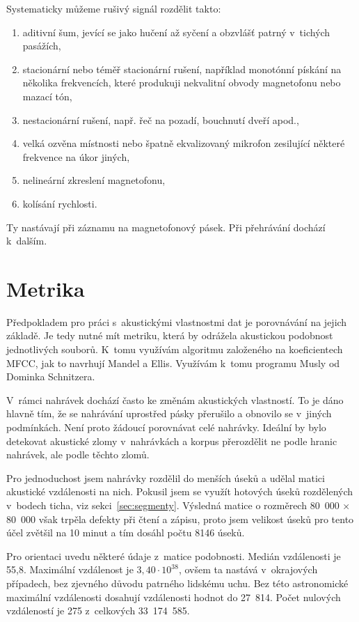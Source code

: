 Systematicky můžeme rušivý signál rozdělit takto:
\begin{enumerate}
\item{
    aditivní šum, jevící se jako hučení až syčení a obzvlášť patrný v~tichých
    pasážích,
}
\item{
    stacionární nebo téměř stacionární rušení, například monotónní pískání na
    několika frekvencích, které produkuji nekvalitní obvody magnetofonu
    nebo mazací tón,
}
\item{
    nestacionární rušení, např. řeč na pozadí, bouchnutí dveří apod.,
}
\item{
    velká ozvěna místnosti nebo špatně ekvalizovaný mikrofon zesilující
    některé frekvence na úkor jiných,
}
\item{
    nelineární zkreslení magnetofonu,
}
\item{
    kolísání rychlosti.
}
\end{enumerate}
Ty nastávají při záznamu na magnetofonový pásek. Při přehrávání dochází
k~dalším.

\section{Metrika}
\label{sec:akustika:metrika}

Předpokladem pro práci s~akustickými vlastnostmi dat je porovnávání na jejich
základě. Je tedy nutné mít metriku, která by odrážela akustickou podobnost
jednotlivých souborů. K~tomu využívám algoritmu založeného na koeficientech
MFCC, jak to navrhují Mandel a Ellis\cite{mandel2005song}. Využívám
k~tomu programu Musly od Dominka Schnitzera\cite{schnitzer2011using}.

V~rámci nahrávek dochází často ke změnám akustických vlastností. To je dáno
hlavně tím, že se nahrávání uprostřed pásky přerušilo a obnovilo se v~jiných
podmínkách. Není proto žádoucí porovnávat celé nahrávky. Ideální by bylo
detekovat akustické zlomy v~nahrávkách a korpus přerozdělit ne podle hranic
nahrávek, ale podle těchto zlomů.

Pro jednoduchost jsem nahrávky rozdělil do menších úseků a udělal matici
akustické vzdálenosti na nich. Pokusil jsem se využít hotových úseků rozdělených
v~bodech ticha, viz sekci~\ref{sec:segmenty}. Výsledná matice o rozměrech
80~000 × 80~000 však trpěla defekty při čtení a zápisu, proto jsem velikost
úseků pro tento účel zvětšil na 10 minut a tím dosáhl počtu 8146 úseků.

Pro orientaci uvedu některé údaje z~matice podobnosti. 
Medián vzdálenosti je 55,8.
Maximální vzdálenost je $3,40\cdot{}10^{38}$, ovšem ta nastává v~okrajových
případech, bez zjevného důvodu patrného lidskému uchu. Bez této astronomické
maximální vzdálenosti dosahují vzdálenosti hodnot do 27~814.
Počet nulových vzdáleností je 275 z~celkových 33~174~585.



